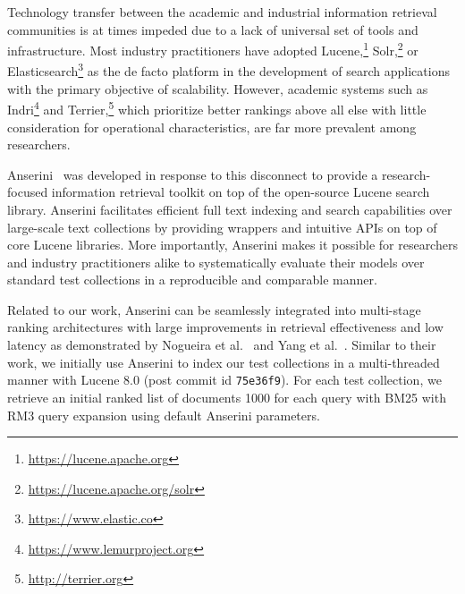 Technology transfer between the academic and industrial information retrieval communities is at times impeded due to a lack of universal set of tools and infrastructure.
Most industry practitioners have adopted Lucene,\footnote{\url{https://lucene.apache.org}} Solr,\footnote{\url{https://lucene.apache.org/solr}} or Elasticsearch\footnote{\url{https://www.elastic.co}} as the de facto platform in the development of search applications with the primary objective of scalability.
However, academic systems such as Indri\footnote{\url{https://www.lemurproject.org}} and Terrier,\footnote{\url{http://terrier.org}} which prioritize better rankings above all else with little consideration for operational characteristics, are far more prevalent among researchers.

Anserini~\cite{Yang_etal_SIGIR2017} was developed in response to this disconnect to provide a research-focused information retrieval toolkit on top of the open-source Lucene search library.
Anserini facilitates efficient full text indexing and search capabilities over large-scale text collections by providing wrappers and intuitive APIs on top of core Lucene libraries.
More importantly, Anserini makes it possible for researchers and industry practitioners alike to systematically evaluate their models over standard test collections in a reproducible and comparable manner.

Related to our work, Anserini can be seamlessly integrated into multi-stage ranking architectures with large improvements in retrieval effectiveness and low latency as demonstrated by Nogueira et al.~\cite{nogueira2019passage} and Yang et al.~\cite{yang2019end}.
Similar to their work, we initially use Anserini to index our test collections in a multi-threaded manner with Lucene 8.0 (post commit id \texttt{75e36f9}).
For each test collection, we retrieve an initial ranked list of documents 1000 for each query with BM25 with RM3 query expansion using default Anserini parameters.



